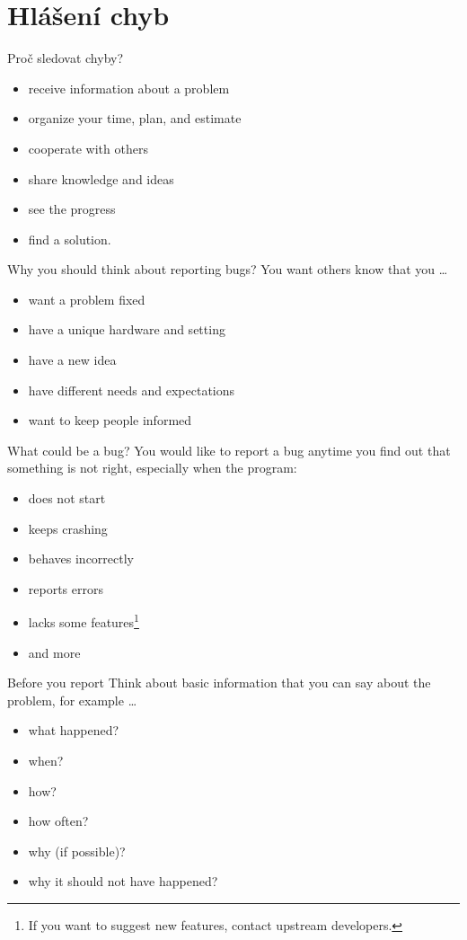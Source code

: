 \documentclass[12pt,aspectratio=169]{beamer}
\begin{document}
\section{Hlášení chyb}
\begin{frame}{Proč sledovat chyby?}

\begin{itemize}
	\item receive information about a problem
	\item organize your time, plan, and estimate
	\item cooperate with others
	\item share knowledge and ideas
	\item see the progress
	\item find a solution.
\end{itemize}
\end{frame}

\begin{frame}{Why you should think about reporting bugs?}
You want others know that you  \ldots{}
\begin{itemize}
	\item want a problem fixed
	\item have a unique hardware and setting
	\item have a new idea
	\item have different needs and expectations
	\item want to keep people informed
\end{itemize}

\end{frame}

\begin{frame}{What could be a bug?}
You would like to report a bug anytime you find out that something is not right, especially when the program:
\begin{itemize}
	\item does not start
	\item keeps crashing
	\item behaves incorrectly
	\item reports errors
	\item lacks some features\footnote{If you want to suggest new features, contact upstream developers.}
	\item and more
\end{itemize}

\end{frame}

\begin{frame}{Before you report}
Think about basic information that you can say about the problem, for example \ldots

\begin{itemize}
	\item what happened?
	\item when? 
	\item how? 
	\item how often?
	\item why (if possible)?
	\item why it should not have happened?
\end{itemize}	
\end{frame}
\end{document}
